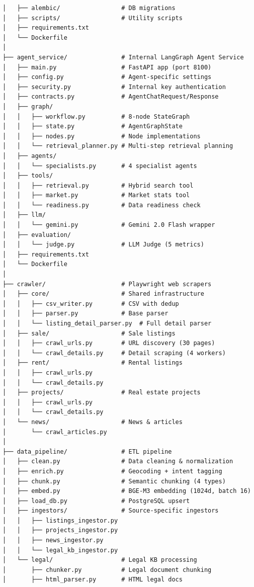 \begin{lstlisting}[basicstyle=\ttfamily\footnotesize]
│   ├── alembic/                 # DB migrations
│   ├── scripts/                 # Utility scripts
│   ├── requirements.txt
│   └── Dockerfile
│
├── agent_service/               # Internal LangGraph Agent Service
│   ├── main.py                  # FastAPI app (port 8100)
│   ├── config.py                # Agent-specific settings
│   ├── security.py              # Internal key authentication
│   ├── contracts.py             # AgentChatRequest/Response
│   ├── graph/
│   │   ├── workflow.py          # 8-node StateGraph
│   │   ├── state.py             # AgentGraphState
│   │   ├── nodes.py             # Node implementations
│   │   └── retrieval_planner.py # Multi-step retrieval planning
│   ├── agents/
│   │   └── specialists.py       # 4 specialist agents
│   ├── tools/
│   │   ├── retrieval.py         # Hybrid search tool
│   │   ├── market.py            # Market stats tool
│   │   └── readiness.py         # Data readiness check
│   ├── llm/
│   │   └── gemini.py            # Gemini 2.0 Flash wrapper
│   ├── evaluation/
│   │   └── judge.py             # LLM Judge (5 metrics)
│   ├── requirements.txt
│   └── Dockerfile
│
├── crawler/                     # Playwright web scrapers
│   ├── core/                    # Shared infrastructure
│   │   ├── csv_writer.py        # CSV with dedup
│   │   ├── parser.py            # Base parser
│   │   └── listing_detail_parser.py  # Full detail parser
│   ├── sale/                    # Sale listings
│   │   ├── crawl_urls.py        # URL discovery (30 pages)
│   │   └── crawl_details.py     # Detail scraping (4 workers)
│   ├── rent/                    # Rental listings
│   │   ├── crawl_urls.py
│   │   └── crawl_details.py
│   ├── projects/                # Real estate projects
│   │   ├── crawl_urls.py
│   │   └── crawl_details.py
│   └── news/                    # News & articles
│       └── crawl_articles.py
│
├── data_pipeline/               # ETL pipeline
│   ├── clean.py                 # Data cleaning & normalization
│   ├── enrich.py                # Geocoding + intent tagging
│   ├── chunk.py                 # Semantic chunking (4 types)
│   ├── embed.py                 # BGE-M3 embedding (1024d, batch 16)
│   ├── load_db.py               # PostgreSQL upsert
│   ├── ingestors/               # Source-specific ingestors
│   │   ├── listings_ingestor.py
│   │   ├── projects_ingestor.py
│   │   ├── news_ingestor.py
│   │   └── legal_kb_ingestor.py
│   └── legal/                   # Legal KB processing
│       ├── chunker.py           # Legal document chunking
│       ├── html_parser.py       # HTML legal docs

\end{lstlisting}
